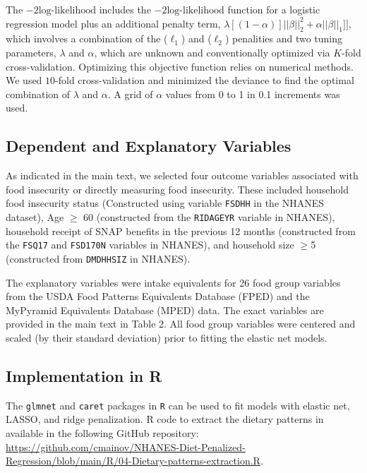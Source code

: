 \documentclass{article}
\begin{document}
The $-2\text{log-likelihood}$ includes the $-2\text{log-likelihood}$ function for a logistic regression model plus an additional penalty term, $\lambda[(1-\alpha)]||\beta||_2^2+\alpha||\beta||_1]]$, which involves a combination of the ($\ell_1$) and ($\ell_2$) penalities and two tuning parameters, $\lambda$ and $\alpha$, which are unknown and conventionally optimized via $K$-fold cross-validation. Optimizing this objective function relies on numerical methods. \supercite{jin2009elastic} We used $10$-fold cross-validation and minimized the deviance to find the optimal combination of $\lambda$ and $\alpha$. A grid of $\alpha$ values from 0 to 1 in 0.1 increments was used. 

\subsection{Dependent and Explanatory Variables}
 \hspace{\parindent} As indicated in the main text, we selected four outcome variables associated with food insecurity or directly measuring food insecurity. These included household food insecurity status (Constructed using variable \texttt{FSDHH} in the NHANES dataset), Age $\ge$ 60 (constructed from the \texttt{RIDAGEYR} variable in NHANES), household receipt of SNAP benefits in the previous 12 months (constructed from the \texttt{FSQ17} and \texttt{FSD170N} variables in NHANES), and household size $\ge$5 (constructed from \texttt{DMDHHSIZ} in NHANES).
 
  \hspace{\parindent} The explanatory variables were intake equivalents for 26 food group variables from the USDA Food Patterns Equivalents Database (FPED) and the MyPyramid Equivalents Database (MPED) data. The exact variables are provided in the main text in Table 2. All food group variables were centered and scaled (by their standard deviation) prior to fitting the elastic net models.
 
\subsection{Implementation in R}
 \hspace{\parindent} The \texttt{glmnet} and \texttt{caret} packages in \texttt{R} can be used to fit models with elastic net, LASSO, and ridge penalization. R code to extract the dietary patterns in available in the following GitHub repository: \textcolor{blue}{\url{https://github.com/cmainov/NHANES-Diet-Penalized-Regression/blob/main/R/04-Dietary-patterns-extraction.R}}.
\end{document}
